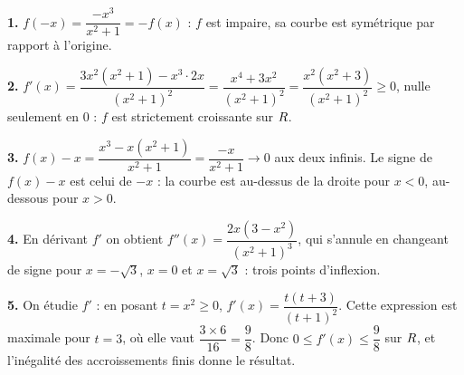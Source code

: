 \begin{corrige}
\textbf{1.} $f(-x) = \dfrac{-x^{3}}{x^{2}+1} = -f(x)$ : $f$ est impaire, sa
courbe est symétrique par rapport à l'origine.

\textbf{2.} $f'(x) = \dfrac{3x^{2}(x^{2}+1) - x^{3}\cdot 2x}{(x^{2}+1)^{2}}
= \dfrac{x^{4}+3x^{2}}{(x^{2}+1)^{2}} = \dfrac{x^{2}(x^{2}+3)}{(x^{2}+1)^{2}} \geq 0$,
nulle seulement en $0$ : $f$ est strictement croissante sur $R$.

\textbf{3.} $f(x) - x = \dfrac{x^{3}-x(x^{2}+1)}{x^{2}+1} = \dfrac{-x}{x^{2}+1} \to 0$
aux deux infinis. Le signe de $f(x)-x$ est celui de $-x$ : la courbe est
au-dessus de la droite pour $x<0$, au-dessous pour $x>0$.

\textbf{4.} En dérivant $f'$ on obtient
$f''(x) = \dfrac{2x(3-x^{2})}{(x^{2}+1)^{3}}$, qui s'annule en changeant de
signe pour $x = -\sqrt{3}$, $x = 0$ et $x = \sqrt{3}$ : trois points
d'inflexion.

\textbf{5.} On étudie $f'$ : en posant $t = x^{2} \geq 0$,
$f'(x) = \dfrac{t(t+3)}{(t+1)^{2}}$. Cette expression est maximale pour $t=3$,
où elle vaut $\dfrac{3 \times 6}{16} = \dfrac{9}{8}$. Donc
$0 \leq f'(x) \leq \dfrac{9}{8}$ sur $R$, et l'inégalité des accroissements
finis donne le résultat.
\end{corrige}
